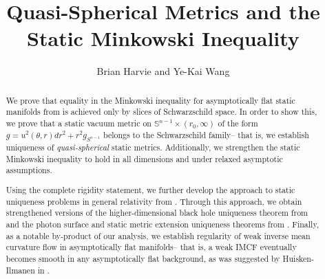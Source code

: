 \documentclass[12pt,twoside]{article}
\title{Quasi-Spherical Metrics and the Static Minkowski Inequality}
\author{Brian Harvie and Ye-Kai Wang}
\date{}
\theoremstyle{plain}
\theoremstyle{definition}
\theoremstyle{remark}
\numberwithin{equation}{section}
\begin{document}
\pagestyle{fancy}
\fancyhf{} %
\renewcommand{\headrulewidth}{0pt}
\fancyhf[FC]{\thepage}




\maketitle
\vspace{-2cm}
\begin{abstract}
We prove that equality in the Minkowski inequality for asymptotically flat static manifolds from \cite{Mc} is achieved only by slices of Schwarzschild space. In order to show this, we prove that a static vacuum metric on $\mathbb{S}^{n-1} \times (r_{0},\infty)$ of the form $g= u^{2}(\theta,r)dr^{2} + r^{2}g_{S^{n-1}}$ belongs to the Schwarzschild family-- that is, we establish uniqueness of \textit{quasi-spherical} static metrics. Additionally, we strengthen the static Minkowski inequality to hold in all dimensions and under relaxed asymptotic assumptions.

Using the complete rigidity statement, we further develop the approach to static uniqueness problems in general relativity from \cite{HW}. Through this approach, we obtain strengthened versions of the higher-dimensional black hole uniqueness theorem from \cite{AM} and the photon surface and static metric extension uniqueness theorems from \cite{HW}. Finally, as a notable by-product of our analysis, we establish regularity of weak inverse mean curvature flow in asymptotically flat manifolds-- that is, a weak IMCF eventually becomes smooth in any asymptotically flat background, as was suggested by Huisken-Ilmanen in \cite{HI2}.


\end{abstract}


\tableofcontents
\end{document}
